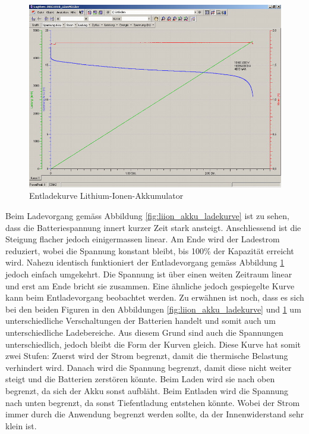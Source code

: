 \begin{figure}[h!]
	\centering
\includegraphics[width=1.0\textwidth]{images/liion_entladekurve.jpg}
	\caption{Entladekurve Lithium-Ionen-Akkumulator \cite{liion_entladekurve}}
\label{fig:liion_akku_entladekurve}
\end{figure}

\newpage

Beim Ladevorgang gemäss Abbildung \ref{fig:liion_akku_ladekurve} ist zu sehen, dass die Batteriespannung innert kurzer Zeit stark ansteigt. Anschliessend ist die Steigung flacher jedoch einigermassen linear. Am Ende wird der Ladestrom reduziert, wobei die Spannung konstant bleibt, bis 100\% der Kapazität erreicht wird.
Nahezu identisch funktioniert der Entladevorgang gemäss Abbildung \ref{fig:liion_akku_entladekurve} jedoch einfach umgekehrt. Die Spannung ist über einen weiten Zeitraum linear und erst am Ende bricht sie zusammen. Eine ähnliche jedoch gespiegelte Kurve kann beim Entladevorgang beobachtet werden.
Zu erwähnen ist noch, dass es sich bei den beiden Figuren in den Abbildungen \ref{fig:liion_akku_ladekurve} und \ref{fig:liion_akku_entladekurve} um unterschiedliche Verschaltungen der Batterien handelt und somit auch um unterschiedliche Ladebereiche. Aus diesem Grund sind auch die Spannungen unterschiedlich, jedoch bleibt die Form der Kurven gleich. Diese Kurve hat somit zwei Stufen: Zuerst wird der Strom begrenzt, damit die thermische Belastung verhindert wird. Danach wird die Spannung begrenzt, damit diese nicht weiter steigt und die Batterien zerstören könnte. Beim Laden wird sie nach oben begrenzt, da sich der Akku sonst aufbläht. Beim Entladen wird die Spannung nach unten begrenzt, da sonst Tiefentladung entstehen könnte. Wobei der Strom immer durch die Anwendung begrenzt werden sollte, da der Innenwiderstand sehr klein ist.

